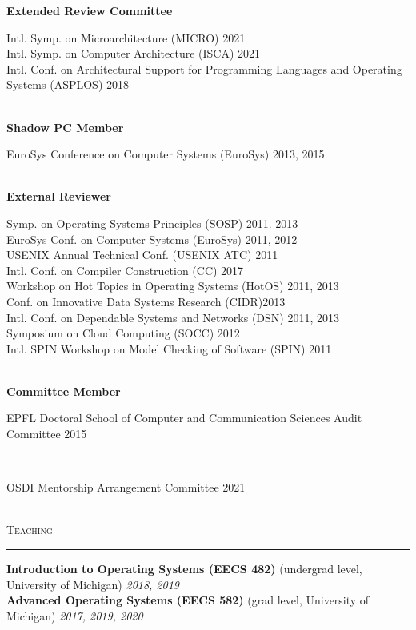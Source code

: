 \documentclass[10pt]{article}
\newcommand{\mysec}[1]{\vspace{2em}\textsc{\large #1}\vspace{1mm}\hrule\vspace{2mm}}
\newcommand{\mysub}[3]{\textbf{#1} {#2} \hfill {\em #3}}
\newcommand{\myssub}[1]{\hspace*{2mm}\parbox{163mm}{#1}\vspace*{2mm}}
\begin{document}
\mysub{Extended Review Committee}{}{}\\
\myssub{\vspace{2mm}
  Intl. Symp. on Microarchitecture (MICRO) \hfill 2021 \\
  Intl. Symp. on Computer Architecture (ISCA) \hfill 2021 \\
  Intl. Conf. on Architectural Support for Programming Languages and Operating Systems (ASPLOS) \hfill 2018 \\
}\\

\mysub{Shadow PC Member}{}{} \\ 
\myssub{\vspace{2mm}EuroSys Conference on Computer Systems (EuroSys) \hfill 2013, 2015} \\

\mysub{External Reviewer}{}{} \\ 
\myssub{\vspace{2mm}Symp. on Operating Systems Principles (SOSP) \hfill 2011. 2013 \\
EuroSys Conf. on Computer Systems (EuroSys) \hfill 2011, 2012 \\
USENIX Annual Technical Conf. (USENIX ATC) \hfill 2011 \\
Intl. Conf. on Compiler Construction (CC) \hfill 2017 \\
Workshop on Hot Topics in Operating Systems (HotOS) \hfill 2011, 2013 \\
Conf. on Innovative Data Systems Research (CIDR)\hfill 2013\\
Intl. Conf. on Dependable Systems and Networks (DSN) \hfill 2011, 2013 \\
Symposium on Cloud Computing (SOCC) \hfill 2012 \\
Intl. SPIN Workshop on Model Checking of Software (SPIN) \hfill 2011} \\

\mysub{Committee Member}{}{} \\
\myssub{\vspace{2mm}EPFL Doctoral School of Computer and Communication Sciences Audit Committee \hfill 2015}\\
\myssub{\vspace{2mm}OSDI Mentorship Arrangement Committee \hfill 2021}\\

\mysec{Teaching}
\mysub{Introduction to Operating Systems (EECS 482)}{(undergrad level, University of Michigan)}{\rm 2018, 2019\vspace{2mm}} \\
\mysub{Advanced Operating Systems (EECS 582)}{(grad level, University of Michigan)}{\rm 2017, 2019, 2020\vspace{2mm}} 
\end{document}
